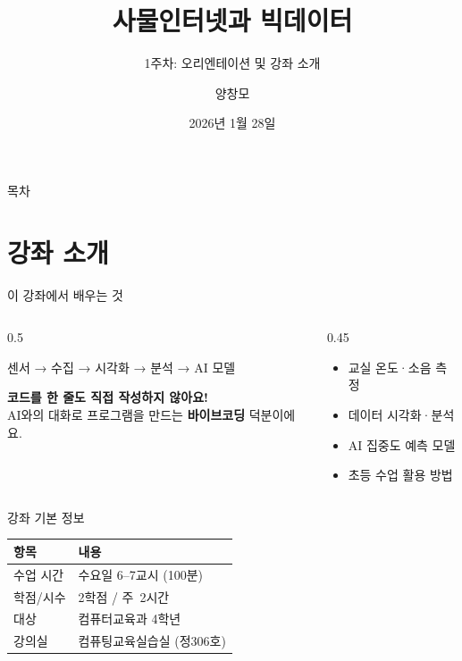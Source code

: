 \documentclass[aspectratio=169]{beamer}
\title{\emoji{seedling} 사물인터넷과 빅데이터}
\subtitle{1주차: 오리엔테이션 및 강좌 소개}
\author{양창모}
\institute{청주교육대학교 컴퓨터교육과}
\date{2026년 1월 28일}
\begin{document}

\begin{frame}
\titlepage
\end{frame}

\begin{frame}{ 목차}
\tableofcontents
\end{frame}

\section{ 강좌 소개}

\begin{frame}{ 이 강좌에서 배우는 것}
\begin{columns}
  \begin{column}{0.5\textwidth}
    \begin{tcolorbox}[keybox, title=핵심 흐름]
      {\small 센서 → 수집 → 시각화 → 분석 → AI 모델}
    \end{tcolorbox}
    \vspace{0.4cm}
    \begin{tcolorbox}[tipbox]
      {\small {} \textbf{코드를 한 줄도 직접 작성하지 않아요!}\\[0.15cm]
      AI와의 대화로 프로그램을 만드는 \mbox{\textbf{바이브코딩}} 덕분이에요.}
    \end{tcolorbox}
  \end{column}
  \begin{column}{0.45\textwidth}
    \begin{itemize}
      \item {} 교실 온도·소음 측정
      \item {} 데이터 시각화·분석
      \item {} AI 집중도 예측 모델
      \item {} 초등 수업 활용 방법
    \end{itemize}
  \end{column}
\end{columns}
\end{frame}

\begin{frame}{ 강좌 기본 정보}
\begin{center}
\renewcommand{\arraystretch}{1.5}
\begin{tabular}{ll}
\toprule
\textbf{항목} & \textbf{내용} \\
\midrule
수업 시간 & 수요일 6--7교시 (100분) \\
학점/시수 & 2학점 / 주~2시간 \\
대상 & 컴퓨터교육과 4학년 \\
강의실 & 컴퓨팅교육실습실 (정306호) \\
\bottomrule
\end{tabular}
\end{center}
\end{frame}
\end{document}
